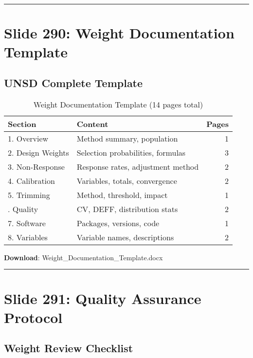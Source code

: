 \documentclass[
]{article}
\begin{document}
\begin{center}\rule{0.5\linewidth}{0.5pt}\end{center}

\section{Slide 290: Weight Documentation
Template}\label{slide-290-weight-documentation-template}

\subsection{UNSD Complete Template}\label{unsd-complete-template}

\begin{longtable}[t]{llr}
\caption{\label{tab:documentation-template}Weight Documentation Template (14 pages total)}\\
\toprule
Section & Content & Pages\\
\midrule
1. Overview & Method summary, population & 1\\
2. Design Weights & Selection probabilities, formulas & 3\\
3. Non-Response & Response rates, adjustment method & 2\\
4. Calibration & Variables, totals, convergence & 2\\
5. Trimming & Method, threshold, impact & 1\\
\addlinespace
6. Quality & CV, DEFF, distribution stats & 2\\
7. Software & Packages, versions, code & 1\\
8. Variables & Variable names, descriptions & 2\\
\bottomrule
\end{longtable}

\textbf{Download}: Weight\_Documentation\_Template.docx

\begin{center}\rule{0.5\linewidth}{0.5pt}\end{center}

\section{Slide 291: Quality Assurance
Protocol}\label{slide-291-quality-assurance-protocol}

\subsection{Weight Review Checklist}\label{weight-review-checklist}
\end{document}
